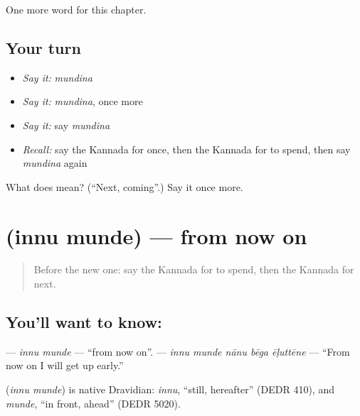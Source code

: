 \begin{grammarlens}[title={What you've built}]
One more word for this chapter.
\end{grammarlens}

\subsection*{Your turn}
\begin{itemize}
\raggedright
  \item \emph{Say it:} \emph{mundina}
  \item \emph{Say it:} \emph{mundina}, once more
  \item \emph{Say it:} say \emph{mundina}
  \item \emph{Recall:} say the Kannada for once, then the Kannada for to spend, then say \emph{mundina} again
\end{itemize}

\begin{tcolorbox}[breakable,colback=teal!4,colframe=teal!35!black,title={Before you move on}]
What does  mean? (\textquotedblleft{}Next, coming\textquotedblright{}.) Say it once more.
\end{tcolorbox}
\section[\texorpdfstring{\kn{ಇನ್ನು} \kn{ಮುಂದೆ} (innu munde)}{ಇನ್ನು ಮುಂದೆ (innu munde)}]{  (innu munde) — from now on}

\label{lesson:KA-C156-innu-munde}



\begin{quote}
Before the new one: say the Kannada for to spend, then the Kannada for next.
\end{quote}

\subsection*{You'll want to know:  }
\textbf{ } — \emph{innu munde} — \textquotedblleft{}from now on\textquotedblright{}. \textbf{    } — \emph{innu munde nānu bēga ēḷuttēne} — \textquotedblleft{}From now on I will get up early.\textquotedblright{}

\begin{cousinweb}
\textbf{ } (\emph{innu munde}) is native Dravidian: \emph{innu}, \textquotedblleft{}still, hereafter\textquotedblright{} (DEDR 410), and \emph{munde}, \textquotedblleft{}in front, ahead\textquotedblright{} (DEDR 5020).
\end{cousinweb}

